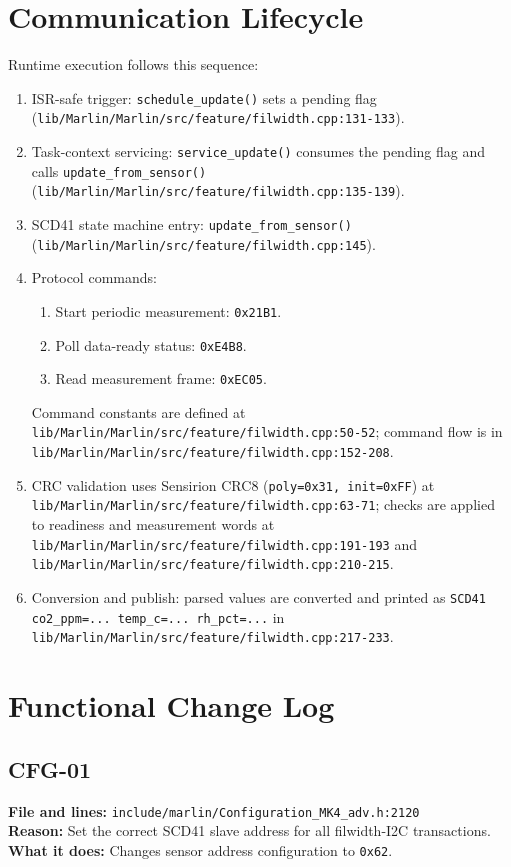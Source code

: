 \section{Communication Lifecycle}
Runtime execution follows this sequence:
\begin{enumerate}
  \item ISR-safe trigger: \texttt{schedule\_update()} sets a pending flag (\texttt{lib/Marlin/Marlin/src/feature/filwidth.cpp:131-133}).
  \item Task-context servicing: \texttt{service\_update()} consumes the pending flag and calls \texttt{update\_from\_sensor()} (\texttt{lib/Marlin/Marlin/src/feature/filwidth.cpp:135-139}).
  \item SCD41 state machine entry: \texttt{update\_from\_sensor()} (\texttt{lib/Marlin/Marlin/src/feature/filwidth.cpp:145}).
  \item Protocol commands:
  \begin{enumerate}
    \item Start periodic measurement: \texttt{0x21B1}.
    \item Poll data-ready status: \texttt{0xE4B8}.
    \item Read measurement frame: \texttt{0xEC05}.
  \end{enumerate}
  Command constants are defined at \texttt{lib/Marlin/Marlin/src/feature/filwidth.cpp:50-52}; command flow is in \texttt{lib/Marlin/Marlin/src/feature/filwidth.cpp:152-208}.
  \item CRC validation uses Sensirion CRC8 (\texttt{poly=0x31, init=0xFF}) at \texttt{lib/Marlin/Marlin/src/feature/filwidth.cpp:63-71}; checks are applied to readiness and measurement words at \texttt{lib/Marlin/Marlin/src/feature/filwidth.cpp:191-193} and \texttt{lib/Marlin/Marlin/src/feature/filwidth.cpp:210-215}.
  \item Conversion and publish: parsed values are converted and printed as \texttt{SCD41 co2\_ppm=... temp\_c=... rh\_pct=...} in \texttt{lib/Marlin/Marlin/src/feature/filwidth.cpp:217-233}.
\end{enumerate}

\section{Functional Change Log}

\subsection*{CFG-01}
\textbf{File and lines:} \texttt{include/marlin/Configuration\_MK4\_adv.h:2120} \\
\textbf{Reason:} Set the correct SCD41 slave address for all filwidth-I2C transactions. \\
\textbf{What it does:} Changes sensor address configuration to \texttt{0x62}.

